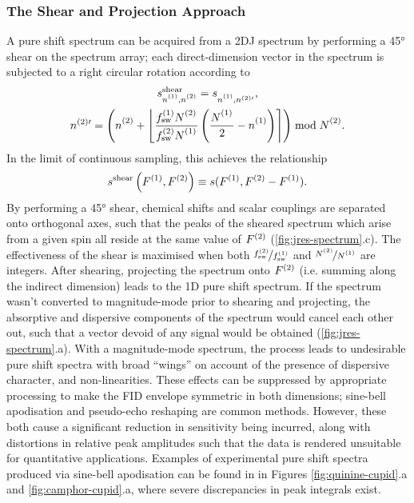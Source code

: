 \subsubsection{The Shear and Projection Approach}
A pure shift spectrum can be acquired from a \ac{2DJ} spectrum by performing a
\ang{45} shear on the spectrum array; each direct-dimension vector in the
spectrum is subjected to a right circular rotation according to
\begin{subequations}
    \begin{gather}
        s_{\none,\ntwo}^{\text{shear}} =
            s_{\none,n^{(2)\prime}}^{\vphantom{{\text{tilt}}}},\\
        n^{(2)\prime} = \left(\ntwo + \left\lfloor
                \frac
                    {\fswone \Ntwo\vpsub{\mathrm{sw}}}
                    {\fswtwo \None\vpsub{\mathrm{sw}}}
                \left(
                    \frac{\None\vpsub{\mathrm{sw}}}{2} - \none
                \right)
            \right\rceil
        \right) \bmod \Ntwo.
    \end{gather}
\end{subequations}
In the limit of continuous sampling, this achieves the relationship
\[
    s^{\text{shear}}\left(F^{(1)},F^{(2)}\right) \equiv s(F^{(1)}, F^{(2)} - F^{(1)}).
\]
By performing a \ang{45} shear, chemical shifts and scalar couplings are
separated onto orthogonal axes,
such that the peaks of the sheared spectrum which arise from a given spin all
reside at the same value of $F^{(2)}$ (\cref{fig:jres-spectrum}.c). The
effectiveness of the shear is maximised when both $\nicefrac{f_{\mathrm{sw}}^{(2)}}{f_{\mathrm{sw}}^{(1)}}$
and $\nicefrac{\Ntwo}{\None}$ are integers. After shearing, projecting the
spectrum onto $F^{(2)}$ (i.e. summing along the indirect dimension) leads
to the \ac{1D} pure shift spectrum.
If the spectrum wasn't converted to magnitude-mode prior to shearing and
projecting, the absorptive and dispersive components of the spectrum would
cancel each other out, such that a vector devoid of any signal would be
obtained (\cref{fig:jres-spectrum}.a).
With a magnitude-mode spectrum, the process leads to undesirable pure shift
spectra with broad ``wings'' on account of the presence of dispersive
character, and non-linearities. These effects can be suppressed by appropriate
processing to make the FID envelope symmetric in both dimensions;
sine-bell apodisation and pseudo-echo reshaping\cite{Bax1981} are common methods.
However, these both cause a significant reduction in sensitivity being
incurred, along with distortions in relative peak amplitudes such that the data is
rendered unsuitable for quantitative applications. Examples of experimental
pure shift spectra produced via sine-bell apodisation can be found in
in Figures \ref{fig:quinine-cupid}.a and \ref{fig:camphor-cupid}.a, where
severe discrepancies in peak integrals exist.

